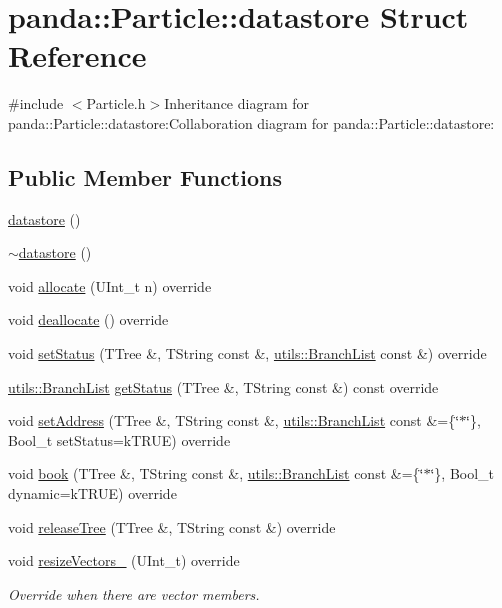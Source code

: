 \hypertarget{structpanda_1_1Particle_1_1datastore}{
\section{panda::Particle::datastore Struct Reference}
\label{structpanda_1_1Particle_1_1datastore}
}


{\ttfamily \#include $<$Particle.h$>$}Inheritance diagram for panda::Particle::datastore:Collaboration diagram for panda::Particle::datastore:\subsection*{Public Member Functions}
\begin{DoxyCompactItemize}
\item 
\hyperlink{structpanda_1_1Particle_1_1datastore_a6e59a47437e52ced2f9605926e0de284}{datastore} ()
\item 
\hyperlink{structpanda_1_1Particle_1_1datastore_afb2d9f4926afbfa8e0f15f0d8d98094a}{$\sim$datastore} ()
\item 
void \hyperlink{structpanda_1_1Particle_1_1datastore_aab4009a97b5f3cc30eaf61cd7dbf2e3d}{allocate} (UInt\_\-t n) override
\item 
void \hyperlink{structpanda_1_1Particle_1_1datastore_ad741e5ab6ebeb9ca897ba9472d0dea36}{deallocate} () override
\item 
void \hyperlink{structpanda_1_1Particle_1_1datastore_a82fcd5398687827418d8bdcbfc16d661}{setStatus} (TTree \&, TString const \&, \hyperlink{classpanda_1_1utils_1_1BranchList}{utils::BranchList} const \&) override
\item 
\hyperlink{classpanda_1_1utils_1_1BranchList}{utils::BranchList} \hyperlink{structpanda_1_1Particle_1_1datastore_a09e5a80068f06d0d2118c2596258b8e3}{getStatus} (TTree \&, TString const \&) const override
\item 
void \hyperlink{structpanda_1_1Particle_1_1datastore_a3e4a1f8d223d8378ef2b92a6d4ccd2b0}{setAddress} (TTree \&, TString const \&, \hyperlink{classpanda_1_1utils_1_1BranchList}{utils::BranchList} const \&=\{\char`\"{}$\ast$\char`\"{}\}, Bool\_\-t setStatus=kTRUE) override
\item 
void \hyperlink{structpanda_1_1Particle_1_1datastore_af75a5d8b8a18ee09ce98ab37888b4404}{book} (TTree \&, TString const \&, \hyperlink{classpanda_1_1utils_1_1BranchList}{utils::BranchList} const \&=\{\char`\"{}$\ast$\char`\"{}\}, Bool\_\-t dynamic=kTRUE) override
\item 
void \hyperlink{structpanda_1_1Particle_1_1datastore_a9fa2653f0e8b59a5cbc752beaf6b7a57}{releaseTree} (TTree \&, TString const \&) override
\item 
void \hyperlink{structpanda_1_1Particle_1_1datastore_aef7e06dbd8399f7de3215aa895907c5f}{resizeVectors\_\-} (UInt\_\-t) override
\begin{DoxyCompactList}\small\item\em Override when there are vector members. \item\end{DoxyCompactList}\end{DoxyCompactItemize}


